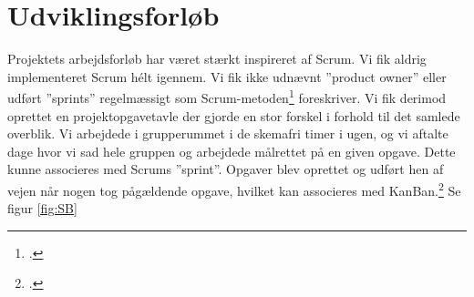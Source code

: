 \section{Udviklingsforløb}

Projektets arbejdsforløb har været stærkt inspireret af Scrum. Vi fik aldrig implementeret Scrum hélt igennem. Vi fik ikke udnævnt ”product owner” eller udført ”sprints” regelmæssigt som Scrum-metoden\footcite{scrum} foreskriver. Vi fik derimod oprettet en projektopgavetavle der gjorde en stor forskel i forhold til det samlede overblik. Vi arbejdede i grupperummet i de skemafri timer i ugen, og vi aftalte dage hvor vi sad hele gruppen og arbejdede målrettet på en given opgave. Dette kunne associeres med Scrums ”sprint”. Opgaver blev oprettet og udført hen af vejen når nogen tog pågældende opgave, hvilket kan associeres med KanBan.\footcite{kanban} Se figur \ref{fig:SB}